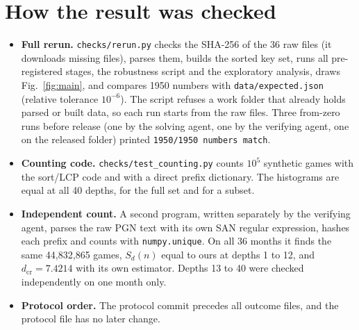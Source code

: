 \documentclass[11pt]{article}
\begin{document}
\section{How the result was checked}
\begin{itemize}
\item \textbf{Full rerun.} \texttt{checks/rerun.py} checks the SHA-256 of the 36 raw files (it downloads missing files), parses them, builds the sorted key set, runs all pre-registered stages, the robustness script and the exploratory analysis, draws Fig.~\ref{fig:main}, and compares 1950 numbers with \texttt{data/expected.json} (relative tolerance $10^{-6}$). The script refuses a work folder that already holds parsed or built data, so each run starts from the raw files. Three from-zero runs before release (one by the solving agent, one by the verifying agent, one on the released folder) printed \texttt{1950/1950 numbers match}.
\item \textbf{Counting code.} \texttt{checks/test\_counting.py} counts $10^5$ synthetic games with the sort/LCP code and with a direct prefix dictionary. The histograms are equal at all 40 depths, for the full set and for a subset.
\item \textbf{Independent count.} A second program, written separately by the verifying agent, parses the raw PGN text with its own SAN regular expression, hashes each prefix and counts with \texttt{numpy.unique}. On all 36 months it finds the same 44,832,865 games, $S_d(n)$ equal to ours at depths 1 to 12, and $d_{\mathrm{cr}}=7.4214$ with its own estimator. Depths 13 to 40 were checked independently on one month only.
\item \textbf{Protocol order.} The protocol commit precedes all outcome files, and the protocol file has no later change.
\end{itemize}
\end{document}
